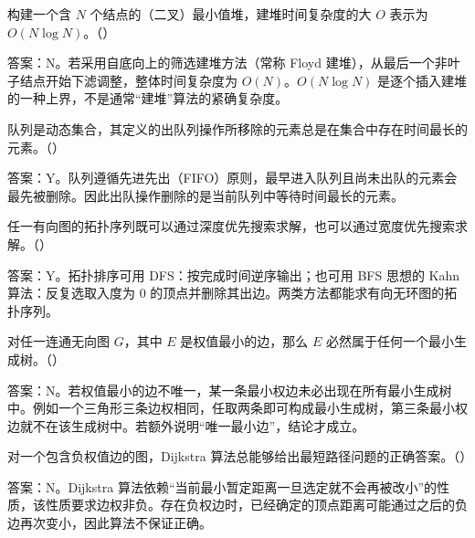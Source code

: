 \begin{question}
构建一个含 $N$ 个结点的（二叉）最小值堆，建堆时间复杂度的大 $O$ 表示为 $O(N\log N)$。（\quad）
\begin{solution}
答案：N。若采用自底向上的筛选建堆方法（常称 Floyd 建堆），从最后一个非叶子结点开始下滤调整，整体时间复杂度为 $O(N)$。$O(N\log N)$ 是逐个插入建堆的一种上界，不是通常“建堆”算法的紧确复杂度。
\end{solution}
\end{question}

\begin{question}
队列是动态集合，其定义的出队列操作所移除的元素总是在集合中存在时间最长的元素。（\quad）
\begin{solution}
答案：Y。队列遵循先进先出（FIFO）原则，最早进入队列且尚未出队的元素会最先被删除。因此出队操作删除的是当前队列中等待时间最长的元素。
\end{solution}
\end{question}

\begin{question}
任一有向图的拓扑序列既可以通过深度优先搜索求解，也可以通过宽度优先搜索求解。（\quad）
\begin{solution}
答案：Y。拓扑排序可用 DFS：按完成时间逆序输出；也可用 BFS 思想的 Kahn 算法：反复选取入度为 $0$ 的顶点并删除其出边。两类方法都能求有向无环图的拓扑序列。
\end{solution}
\end{question}

\begin{question}
对任一连通无向图 $G$，其中 $E$ 是权值最小的边，那么 $E$ 必然属于任何一个最小生成树。（\quad）
\begin{solution}
答案：N。若权值最小的边不唯一，某一条最小权边未必出现在所有最小生成树中。例如一个三角形三条边权相同，任取两条即可构成最小生成树，第三条最小权边就不在该生成树中。若额外说明“唯一最小边”，结论才成立。
\end{solution}
\end{question}

\begin{question}
对一个包含负权值边的图，Dijkstra 算法总能够给出最短路径问题的正确答案。（\quad）
\begin{solution}
答案：N。Dijkstra 算法依赖“当前最小暂定距离一旦选定就不会再被改小”的性质，该性质要求边权非负。存在负权边时，已经确定的顶点距离可能通过之后的负边再次变小，因此算法不保证正确。
\end{solution}
\end{question}

